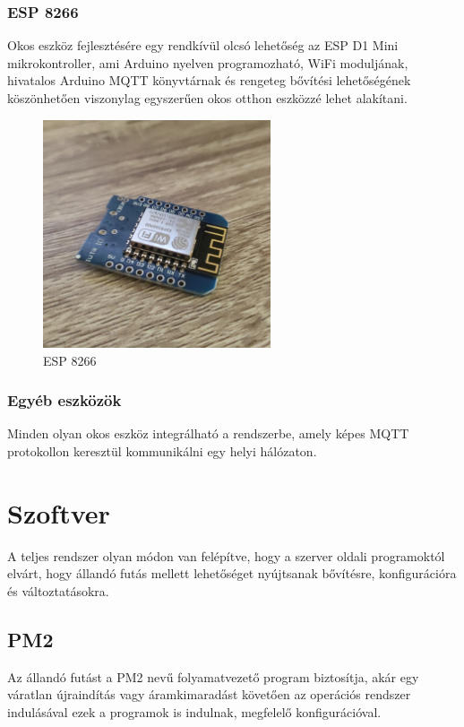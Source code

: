 \documentclass[
]{thesis-ekf}
\theoremstyle{definition}
\theoremstyle{remark}
\begin{document}
\subsection{ESP 8266}

Okos eszköz fejlesztésére egy rendkívül olcsó lehetőség az ESP D1 Mini mikrokontroller, ami Arduino nyelven
programozható, WiFi moduljának, hivatalos Arduino MQTT könyvtárnak és rengeteg bővítési lehetőségének
köszönhetően viszonylag egyszerűen okos otthon eszközzé lehet alakítani.

\begin{figure}[h]
	\centering
	\includegraphics[width=0.6\textwidth]{images/esp.png}
	\caption{ESP 8266}
\end{figure}

\subsection{Egyéb eszközök}
Minden olyan okos eszköz integrálható a rendszerbe, amely képes MQTT protokollon keresztül kommunikálni egy helyi hálózaton.

\chapter{Szoftver}
A teljes rendszer olyan módon van felépítve, hogy a szerver oldali programoktól elvárt, hogy állandó futás mellett lehetőséget 
nyújtsanak bővítésre, konfigurációra és változtatásokra. 
\section{PM2}
Az állandó futást a PM2\cite{pm2} nevű folyamatvezető program biztosítja, akár egy váratlan újraindítás vagy áramkimaradást követően az operációs rendszer indulásával ezek a programok is indulnak, megfelelő konfigurációval.
\end{document}
